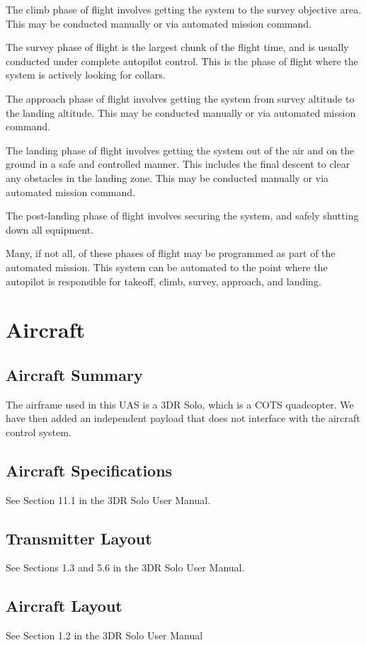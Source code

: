 \documentclass{report}
\begin{document}
			The climb phase of flight involves getting the system to the survey objective area.  This may be conducted manually or via automated mission command.

			The survey phase of flight is the largest chunk of the flight time, and is usually conducted under complete autopilot control.  This is the phase of flight where the system is actively looking for collars.

			The approach phase of flight involves getting the system from survey altitude to the landing altitude.  This may be conducted manually or via automated mission command.

			The landing phase of flight involves getting the system out of the air and on the ground in a safe and controlled manner.  This includes the final descent to clear any obstacles in the landing zone.  This may be conducted manually or via automated mission command.

			The post-landing phase of flight involves securing the system, and safely shutting down all equipment.

			Many, if not all, of these phases of flight may be programmed as part of the automated mission.  This system can be automated to the point where the autopilot is responsible for takeoff, climb, survey, approach, and landing.
	\section{Aircraft}
		\subsection{Aircraft Summary}
			The airframe used in this \gls{UAS} is a 3DR Solo, which is a \gls{COTS} \gls{quadcopter}.  We have then added an independent payload that does not interface with the aircraft control system.
		\subsection{Aircraft Specifications}
			See Section 11.1 in the 3DR Solo User Manual.
		\subsection{Transmitter Layout}
			See Sections 1.3 and 5.6 in the 3DR Solo User Manual.
		\subsection{Aircraft Layout}
			See Section 1.2 in the 3DR Solo User Manual
\end{document}
